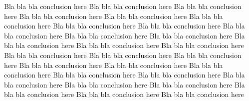 Bla bla bla conclusion here
Bla bla bla conclusion here
Bla bla bla conclusion here
Bla bla bla conclusion here
Bla bla bla conclusion here
Bla bla bla conclusion here
Bla bla bla conclusion here
Bla bla bla conclusion here
Bla bla bla conclusion here
Bla bla bla conclusion here
Bla bla bla conclusion here
Bla bla bla conclusion here
Bla bla bla conclusion here
Bla bla bla conclusion here
Bla bla bla conclusion here
Bla bla bla conclusion here
Bla bla bla conclusion here
Bla bla bla conclusion here
Bla bla bla conclusion here
Bla bla bla conclusion here
Bla bla bla conclusion here
Bla bla bla conclusion here
Bla bla bla conclusion here
Bla bla bla conclusion here
Bla bla bla conclusion here
Bla bla bla conclusion here
Bla bla bla conclusion here
Bla bla bla conclusion here